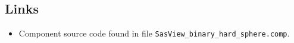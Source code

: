 \subsection*{Links}
\begin{itemize}
  \item Component source code found in file \texttt{SasView\_binary\_hard\_sphere.comp}.
\end{itemize}
